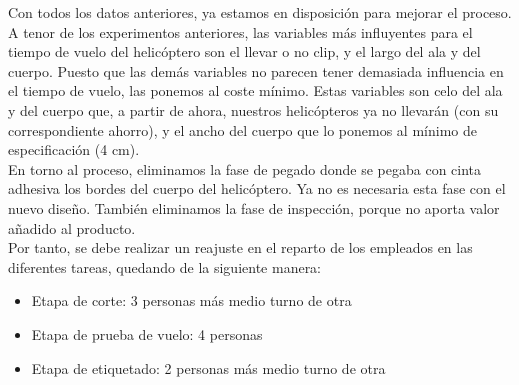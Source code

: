 \documentclass[12pt,a4paper,twoside,openright,titlepage,final]{article}
\begin{document}
Con todos los datos anteriores, ya estamos en disposición para mejorar el proceso. A tenor de los experimentos anteriores, las variables más influyentes para el tiempo de vuelo del helicóptero son el llevar o no clip, y el largo del ala y del cuerpo. Puesto que las demás variables no parecen tener demasiada influencia en el tiempo de vuelo, las ponemos al coste mínimo. Estas variables son celo del ala y del cuerpo que, a partir de ahora, nuestros helicópteros ya no llevarán (con su correspondiente ahorro), y el ancho del cuerpo que lo ponemos al mínimo de especificación (4 cm).\\

En torno al proceso, eliminamos la fase de pegado donde se pegaba con cinta adhesiva los bordes del cuerpo del helicóptero. Ya no es necesaria esta fase con el nuevo diseño. También eliminamos la fase de inspección, porque no aporta valor añadido al producto.\\

Por tanto, se debe realizar un reajuste en el reparto de los empleados en las diferentes tareas, quedando de la siguiente manera:

\begin{itemize}
	\item Etapa de corte: 3 personas más medio turno de otra
	\item Etapa de prueba de vuelo: 4 personas
	\item Etapa de etiquetado: 2 personas más medio turno de otra
\end{itemize}
\end{document}
